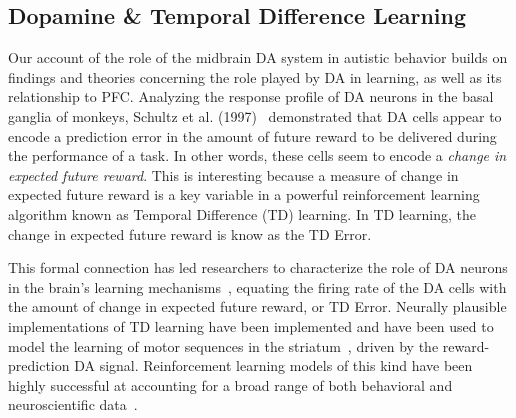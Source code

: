 \subsection{Dopamine \& Temporal Difference Learning}
Our account of the role of the midbrain DA system in autistic behavior builds on findings and theories concerning the role played by DA in learning, as well as its relationship to PFC. Analyzing the response profile of DA neurons in the basal ganglia of monkeys, Schultz et al. (1997)~\nocite{schultz97td} demonstrated that DA cells appear to encode a prediction error in the amount of future reward to be delivered during the performance of a task. In other words, these cells seem to encode a \emph{change in expected future reward}. This is interesting because a measure of change in expected future reward is a key variable in a powerful reinforcement learning algorithm known as Temporal Difference (TD) learning. In TD learning, the change in expected future reward is know as the TD Error. %


This formal connection has led researchers to characterize the role of DA neurons in the brain's learning mechanisms~\cite{BartoAG:1994:TDLearning,MontaguePR:1996:Dopamine}, equating the firing rate of the DA cells with the amount of change in expected future reward, or TD Error. Neurally plausible implementations of TD learning have been implemented and have been used to model the learning of motor sequences in the striatum~\cite{MontaguePR:1996:Dopamine}, driven by the reward-prediction DA signal. Reinforcement learning models of this kind have been highly successful at accounting for a broad range of both behavioral and neuroscientific data~\cite{DayanP:2008:Ugly}.


